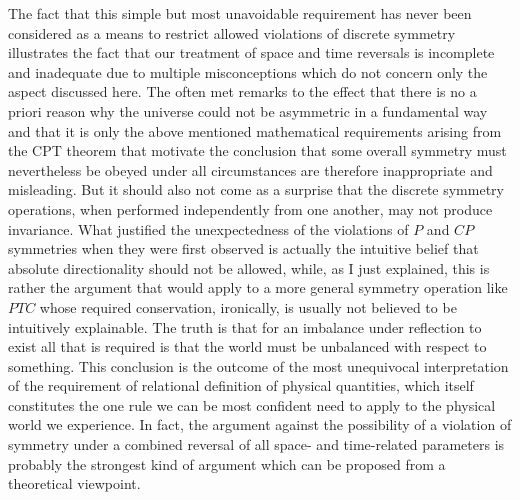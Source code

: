 \documentclass[notitlepage,12pt]{report}
\begin{document}
The fact that this simple but most unavoidable requirement has never been considered as a means to restrict allowed violations of discrete symmetry illustrates the fact that our treatment of space and time reversals is incomplete and inadequate due to multiple misconceptions which do not concern only the aspect discussed here. The often met remarks to the effect that there is no a priori reason why the universe could not be asymmetric in a fundamental way and that it is only the above mentioned mathematical requirements arising from the CPT theorem that motivate the conclusion that some overall symmetry must nevertheless be obeyed under all circumstances are therefore inappropriate and misleading. But it should also not come as a surprise that the discrete symmetry operations, when performed independently from one another, may not produce invariance. What justified the unexpectedness of the violations of $P$ and $CP$ symmetries when they were first observed is actually the intuitive belief that absolute directionality should not be allowed, while, as I just explained, this is rather the argument that would apply to a more general symmetry operation like $PTC$ whose required conservation, ironically, is usually not believed to be intuitively explainable. The truth is that for an imbalance under reflection to exist all that is required is that the world must be unbalanced with respect to something. This conclusion is the outcome of the most unequivocal interpretation of the requirement of relational definition of physical quantities, which itself constitutes the one rule we can be most confident need to apply to the physical world we experience. In fact, the argument against the possibility of a violation of symmetry under a combined reversal of all space- and time-related parameters is probably the strongest kind of argument which can be proposed from a theoretical viewpoint.
\end{document}
